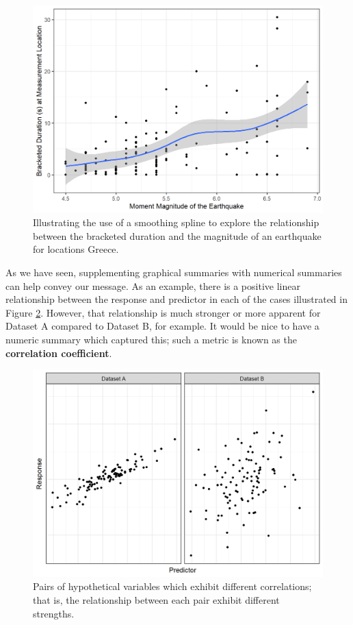 \documentclass[
]{book}
\theoremstyle{plain}
\theoremstyle{mydefn}
\theoremstyle{myexmpl}
\theoremstyle{remark}
\begin{document}
\begin{figure}

{\centering \includegraphics[width=0.8\linewidth]{./Images/regsummaries-spline-1} 

}

\caption{Illustrating the use of a smoothing spline to explore the relationship between the bracketed duration and the magnitude of an earthquake for locations Greece.}\label{fig:regsummaries-spline}
\end{figure}

As we have seen, supplementing graphical summaries with numerical summaries can help convey our message. As an example, there is a positive linear relationship between the response and predictor in each of the cases illustrated in Figure \ref{fig:regsummaries-correlation}. However, that relationship is much stronger or more apparent for Dataset A compared to Dataset B, for example. It would be nice to have a numeric summary which captured this; such a metric is known as the \textbf{correlation coefficient}.

\begin{figure}

{\centering \includegraphics[width=0.8\linewidth]{./Images/regsummaries-correlation-1} 

}

\caption{Pairs of hypothetical variables which exhibit different correlations; that is, the relationship between each pair exhibit different strengths.}\label{fig:regsummaries-correlation}
\end{figure}
\end{document}

